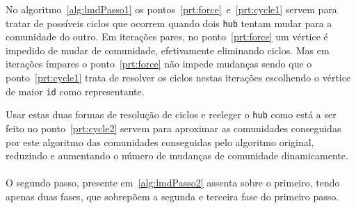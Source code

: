 No algoritmo~\ref{alg:lmdPasso1} os pontos~\ref{prt:force}~e~\ref{prt:cycle1} servem para tratar de possíveis ciclos que ocorrem quando dois \verb|hub| tentam mudar para a comunidade do outro.
Em iterações pares, no ponto~\ref{prt:force} um vértice é impedido de mudar de comunidade, efetivamente eliminando ciclos.
Mas em iterações ímpares o ponto~\ref{prt:force} não impede mudanças sendo que o ponto~\ref{prt:cycle1} trata de resolver os ciclos nestas iterações escolhendo o vértice de maior \verb|id| como representante.

Usar estas duas formas de resolução de ciclos e reeleger o \verb|hub| como está a ser feito no ponto~\ref{prt:cycle2} servem para aproximar as comunidades conseguidas por este algoritmo das comunidades conseguidas pelo algoritmo original, reduzindo e aumentando o número de mudanças de comunidade dinamicamente.

\paragraph{}
O segundo passo, presente em~\ref{alg:lmdPasso2} assenta sobre o primeiro, tendo apenas duas fases, que sobrepõem a segunda e terceira fase do primeiro passo.

